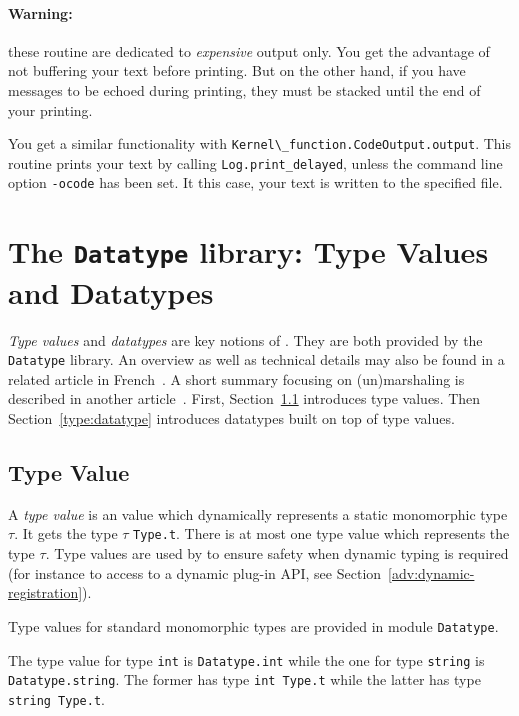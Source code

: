 \paragraph{Warning:} these routine are dedicated to \emph{expensive}
output only. You get the advantage of not buffering your text before
printing. But on the other hand, if you have messages to be echoed
during printing, they must be stacked until the end of your printing.

%
%
You get a similar functionality with
\lstinline{Kernel\_function.CodeOutput.output}. This routine prints your
text by calling \lstinline{Log.print_delayed}, unless the command
line option \texttt{-ocode} has been set. It this case, your text is
written to the specified file.


\section{The \texttt{Datatype} library: Type Values and
  Datatypes}\label{adv:datatype}

\emph{Type values} and \emph{datatypes} are key notions of \framac. They are
both provided by the \texttt{Datatype} library. An overview as well as technical
details may also be found in a related article in
French~\cite{signoles:jfla11}. A short summary focusing on (un)marshaling is
described in another article~\cite{cuoq:ml11}. First,
Section~\ref{type:type-value} introduces type values. Then
Section~\ref{type:datatype} introduces datatypes built on top of type values.

\subsection{Type Value}\label{type:type-value}

A \emph{type value} is an \caml value which dynamically represents a static
monomorphic \caml type $\tau$. It gets the type $\tau$
\texttt{Type.t}. There is at most one type value which
represents the type $\tau$. Type values are used by \framac to ensure safety
when dynamic typing is required (for instance to access to a dynamic plug-in
API, see Section~\ref{adv:dynamic-registration}).

Type values for standard \caml monomorphic types are provided in module
\texttt{Datatype}.
\begin{example}
The type value for type \texttt{int} is
\texttt{Datatype.int} while the one for type
\texttt{string} is \texttt{Datatype.string}. The
former has type \texttt{int Type.t} while the latter has type \texttt{string
  Type.t}.
\end{example}

